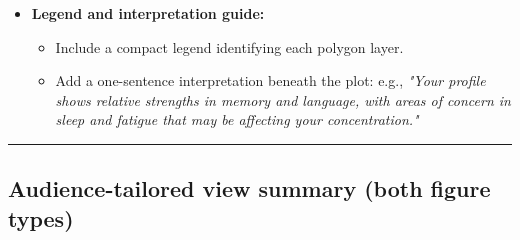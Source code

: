 \begin{itemize}
  \begin{itemize}
  \tightlist
  \item
    Label each vertex with the patient\textquotesingle s percentile
    value.
  \item
    Flag vertices falling in the clinical concern zone with a small
    warning icon or color-shifted marker.
  \item
    Add brief plain-language descriptors at each axis tip (e.g., "Sleep
    quality", "Concentration", "Energy", "Mood", "Memory \& thinking").
  \end{itemize}
\item
  \textbf{Legend and interpretation guide:}

  \begin{itemize}
  \tightlist
  \item
    Include a compact legend identifying each polygon layer.
  \item
    Add a one-sentence interpretation beneath the plot: e.g.,
    \emph{"Your profile shows relative strengths in memory and language,
    with areas of concern in sleep and fatigue that may be affecting
    your concentration."}
  \end{itemize}
\end{itemize}

\begin{center}\rule{0.5\linewidth}{0.5pt}\end{center}

\subsection{Audience-tailored view summary (both figure
types)}\label{audience-tailored-view-summary-both-figure-types}

